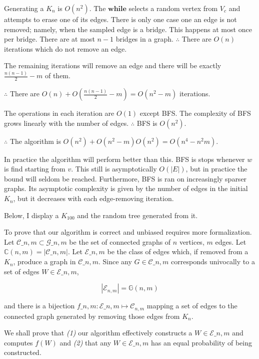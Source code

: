 \documentclass[
]{article}
\begin{document}
Generating a \(K_n\) is \(O(n^2)\). The \(\textbf{while}\) selects a
random vertex from \(V_c\) and attempts to erase one of its edges. There
is only one case one an edge is not removed; namely, when the sampled
edge is a bridge. This happens at most once per bridge. There are at
most \(n - 1\) bridges in a graph. \(\therefore\) There are \(O(n)\)
iterations which do not remove an edge.

The remaining iterations will remove an edge and there will be exactly
\(\frac{n(n-1)}{2} - m\) of them.

\(\therefore\) There are \(O(n) + O(\frac{n(n-1)}{2} - m) = O(n^2 - m)\)
iterations.

The operations in each iteration are \(O(1)\) except BFS. The complexity
of BFS grows linearly with the number of edges. \(\therefore\) BFS is
\(O(n^2)\).

\(\therefore\) The algorithm is
\(O(n^2) + O(n^2 - m)O(n^2) = O(n^4 - n^2m)\).

In practice the algorithm will perform better than this. BFS is stops
whenever \(w\) is find starting from \(v\). This still is asymptotically
\(O(|E|)\), but in practice the bound will seldom be reached.
Furthermore, BFS is ran on increasingly sparser graphs. Its asymptotic
complexity is given by the number of edges in the initial \(K_n\), but
it decreases with each edge-removing iteration.

Below, I display a \(K_{100}\) and the random tree generated from it.

To prove that our algorithm is correct and unbiased requires more
formalization. Let \(\mathcal{C}\_{n,m} \subset \mathcal{G}\_{n,m}\) be
the set of connected graphs of \(n\) vertices, \(m\) edges. Let
\(\mathbb{C}(n,m) = |\mathcal{C}\_{n,m}|\). Let \(\mathcal{E}\_{n, m}\)
be the class of edges which, if removed from a \(K_n\), produce a graph
in \(\mathcal{C}\_{n, m}\). Since any \(G \in \mathcal{C}\_{n, m}\)
corresponds univocally to a set of edges \(W \in \mathcal{E}\_{n,m}\),

\[
|\mathcal{E}_{n, m}| = \mathbb{G}(n, m)
\]

and there is a bijection
\(f\_{n,m} : \mathcal{E}\_{n,m} \mapsto \mathcal{C}_{n, m}\) mapping a
set of edges to the connected graph generated by removing those edges
from \(K_n\).

We shall prove that \emph{(1)} our algorithm effectively constructs a
\(W \in \mathcal{E}\_{n,m}\) and computes \(f(W)\) and \emph{(2)} that
any \(W \in \mathcal{E}\_{n,m}\) has an equal probability of being
constructed.
\end{document}
